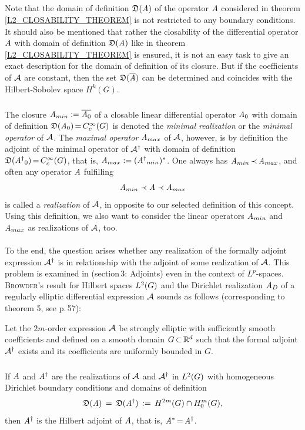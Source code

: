\documentclass[11pt,twoside]{article}
\def\G{G}
\begin{document}
\subparagraph{} %
Note that the domain of definition $\mathfrak{D}(\mathit{A})$
of the operator $\mathit{A}$ considered in theorem \ref{L2_CLOSABILITY_THEOREM}
is not restricted to any boundary conditions.
It should also be mentioned that
rather the closability of the differential operator $\mathit{A}$
with domain of definition $\mathfrak{D}(\mathit{A})$
like in theorem \ref{L2_CLOSABILITY_THEOREM} is ensured,
it is not an easy task to give an exact description
for the domain of definition of its closure.
But if the coefficients of ${\mathcal{A}}$ are constant,
then the set $\mathfrak{D}(\overline{\mathit{A}} )$ can be determined
and coincides with the Hilbert-Sobolev space $H^k(\G)$.

\subparagraph{} %
The closure $\mathit{A}_{min} := \overline{\mathit{A}_0}$
of a closable linear differential operator $\mathit{A}_0$
with domain of definition $\domain{\linA_0} \eq \TF$
is denoted the \textit{minimal realization}
or the \textit{minimal operator} of ${\mathcal{A}}$.
The \textit{maximal operator} $\mathit{A}_{max}$ of ${\mathcal{A}}$,
however,
is by definition the adjoint of the minimal operator of ${\mathcal{A}}^{\dag}$
with domain of definition $\domain{{\linA^{\dag}}_0} \eq \TF$,
that is,
$\mathit{A}_{max} := ({\mathit{A}^{\dag}}_{min})^*$.
One always has $\mathit{A}_{min} \, {\prec} \, \mathit{A}_{max}$,
and often any operator $\mathit{A}$ fulfilling
\[
\mathit{A}_{min} \prec \mathit{A} \prec \mathit{A}_{max}
\]
is called a \textit{realization} of ${\mathcal{A}}$,
in opposite to our selected definition of this concept.
Using this definition,
we also want to consider the linear operators $\mathit{A}_{min}$ and $\mathit{A}_{max}$
as realizations of ${\mathcal{A}}$,
too.

\paragraph{} %
To the end,
the question arises whether any realization
of the formally adjoint expression ${\mathcal{A}}^{\dag}$ is in relationship
with the adjoint of some realization of ${\mathcal{A}}$.
This problem is examined in \cite{Br2} (section\,3: Adjoints)
even in the context of $L^p$-spaces.
\textsc{Browder}'s result for Hilbert spaces $\Lh$
and the Dirichlet realization $\mathit{A}_D$
of a regularly elliptic differential expression ${\mathcal{A}}$ sounds as follows
(corresponding to theorem 5, see p.\,57):

\begin{theorem1}
Let the $2m$-order expression ${\mathcal{A}}$ be strongly elliptic
with sufficiently smooth coefficients
and defined on a smooth domain $\G \xsubset \Rd$
such that the formal adjoint ${\mathcal{A}}^{\dag}$ exists and its coefficients
are uniformly bounded in $\G$.

\subparagraph{} %
If $\mathit{A}$ and $\mathit{A}^{\dag}$ are the realizations of ${\mathcal{A}}$ and ${\mathcal{A}}^{\dag}$
in $\Lh$ with homo\-geneous Dirichlet boundary conditions
and domains of definition
\[
\domain{\linA} \= \domain{{\linA}^{\dag}} \eqdef H^{2m}(\G) \cap \HN{m}{\G},
\]
then $\mathit{A}^{\dag}$ is the Hilbert adjoint of ${\mathit{A}}$,
that is,
${\mathit{A}}^* {\,=\,} \mathit{A}^{\dag}$.
\end{theorem1}
\end{document}

